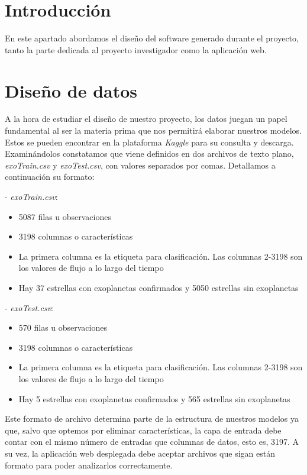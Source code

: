 
\section{Introducción}

En este apartado abordamos el diseño del software generado durante el proyecto, tanto la parte dedicada al proyecto investigador como la aplicación web.

\section{Diseño de datos}

A la hora de estudiar el diseño de nuestro proyecto, los datos juegan un papel fundamental al ser la materia prima que nos permitirá elaborar nuestros modelos. Estos se pueden encontrar en la plataforma \textit{Kaggle} para su consulta y descarga. Examinándolos constatamos que viene definidos en dos archivos de texto plano, \textit{exoTrain.csv} y \textit{exoTest.csv}, con valores separados por comas. Detallamos a continuación su formato:

- \textit{exoTrain.csv}:
\begin{itemize}
	\item 5087 filas u observaciones
	\item 3198 columnas o características
	\item La primera columna es la etiqueta para clasificación. Las columnas 2-3198 son los valores de flujo a lo largo del tiempo
	\item Hay 37 estrellas con exoplanetas confirmados y 5050 estrellas sin exoplanetas
\end{itemize}

- \textit{exoTest.csv}:
\begin{itemize}
	\item 570 filas u observaciones
	\item 3198 columnas o características
	\item La primera columna es la etiqueta para clasificación. Las columnas 2-3198 son los valores de flujo a lo largo del tiempo
	\item Hay 5 estrellas con exoplanetas confirmados y 565 estrellas sin exoplanetas
\end{itemize}

Este formato de archivo determina parte de la estructura de nuestros modelos ya que, salvo que optemos por eliminar características, la capa de entrada debe contar con el mismo número de entradas que columnas de datos, esto es, 3197. A su vez, la aplicación web desplegada debe aceptar archivos que sigan están formato para poder analizarlos correctamente. 

